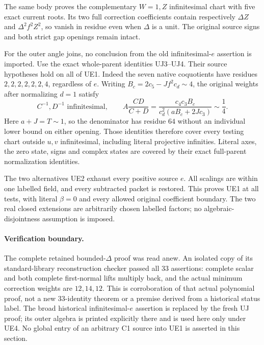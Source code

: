 The same body proves the complementary \(W=1,Z\) infinitesimal
chart with five exact current roots.  Its two full correction
coefficients contain respectively \(\Delta Z\) and
\(\Delta^2 f^2Z^2\), so vanish in residue even when \(\Delta\)
is a unit.  The original source signs and both strict gap openings
remain intact.

For the outer angle joins, no conclusion from the old infinitesimal-\(e\)
assertion is imported.  Use the exact whole-parent identities UJ3--UJ4.
Their source hypotheses hold on all of UE1.  Indeed the seven native
coquotients have residues \(2,2,2,2,2,2,4\), regardless of \(e\).
Writing \(B_c=2c_5-Jf^2c_d\sim4\), the original weights after
normalizing \(d=1\) satisfy
\[
 C^{-1},D^{-1}\text{ infinitesimal},\qquad
 A\frac{CD}{C+D}
 =\frac{c_4c_3B_c}{c_d^2(aB_c+2Jc_3)}\sim\frac14.
 \tag{UE4}
\]
Here \(a+J=T\sim1\), so the denominator has residue \(64\)
without an individual lower bound on either opening.
Those identities therefore cover every testing chart outside
\(u,v\) infinitesimal, including literal projective infinities.
Literal axes, the zero state, signs and complex states are covered
by their exact full-parent normalization identities.

The two alternatives UE2 exhaust every positive source \(e\).
All scalings are within one labelled field, and every subtracted
packet is restored.  This proves UE1 at all tests, with literal
\(\beta=0\) and every allowed original coefficient boundary.
The two real closed extensions are arbitrarily chosen labelled
factors; no algebraic-disjointness assumption is imposed.

\paragraph{Verification boundary.}
The complete retained bounded-\(\Delta\) proof was read anew.
An isolated copy of its standard-library reconstruction checker
passed all \(33\) assertions: complete scalar and both complete
first-normal lifts multiply back, and the actual minimum correction
weights are \(12,14,12\).  This is corroboration of that actual
polynomial proof, not a new \(33\)-identity theorem or a premise
derived from a historical status label.  The broad historical
infinitesimal-\(e\) assertion is replaced by the fresh UJ proof;
its outer algebra is printed explicitly there and is used here
only under UE4.  No global entry of an arbitrary C1 source into
UE1 is asserted in this section.

